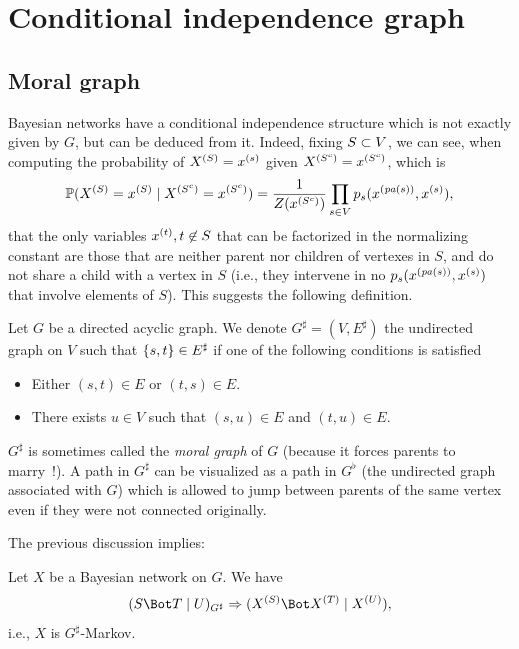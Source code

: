 \section{Conditional independence graph}
\subsection{Moral graph}
Bayesian networks have a conditional independence structure which is
not exactly given by $G$, but can be deduced from it. Indeed, fixing $S\subset V$, we can see, when computing the probability of $X^{(S)}=x^{(s)}$
given $X^{(S^c)} = x^{(S^c)}$, which is
\[
\bm{\mathbb P}(X^{(S)} = x^{(S)} \mid X^{(S^c)} = x^{(S^c)} ) = \frac{1}{Z(x^{(S^c)})} \prod_{s\in V} p_s(x^{({\mathit{pa}(s)})}, x^{(s)}),
\]
 that the only variables $x^{(t)}, t\not \in S$ that
can be factorized in the normalizing constant are those that are
neither parent nor children of vertexes in $S$, and do not share a
child with a vertex in $S$ (i.e., they intervene in no
$p_s(x^{({\mathit{pa}(s)})}, x^{(s)})$ that  involve elements of $S$). This suggests the following definition.
\begin{definition}
\label{def:g.sharp}
Let $G$ be a directed acyclic graph. We denote
$G^\sharp=(V,E^\sharp)$ the undirected graph on $V$ such that
$\left\{ s,t \right\}\in E^\sharp$ if one of the following conditions is satisfied
\begin{itemize}
\item Either $(s,t)\in E$ or $(t,s)\in E$.
\item There exists $u\in V$ such that $(s,u)\in E$ and $(t,u)\in
E$.
\end{itemize}
\end{definition}
$G^\sharp$ is sometimes called the {\em moral graph} of $G$ (because
it forces parents to marry~!). A path in $G^\sharp$ can be visualized as a path in $G^\flat$ (the undirected graph associated with $G$) which is
allowed to jump between parents of the same vertex even if they were
not connected originally.

The previous discussion implies:
\begin{proposition}
\label{prop:g.sharp}
Let $X$ be a Bayesian network on $G$. We have
$$
\cind{S}{T}{U}_{G^\sharp}\Ria \cind{\pe XS}{\pe XT}{\pe XU},
$$
i.e., $X$ is $G^\sharp$-Markov.
\end{proposition}



